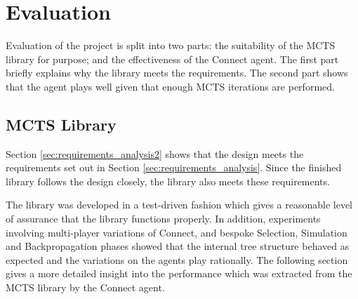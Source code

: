 \chapter{Evaluation}
Evaluation of the project is split into two parts: the suitability of the {MCTS} library for purpose; and the effectiveness of the {Connect} agent. The first part briefly explains why the library meets the requirements. The second part shows that the agent plays well given that enough {MCTS} iterations are performed.

\section{{MCTS} Library}
Section \ref{sec:requirements_analysis2} shows that the design meets the requirements set out in Section \ref{sec:requirements_analysis}. Since the finished library follows the design closely, the library also meets these requirements. 

The library was developed in a test-driven fashion which gives a reasonable level of assurance that the library functions properly. In addition, experiments involving multi-player variations of Connect, and bespoke Selection, Simulation and Backpropagation phases showed that the internal tree structure behaved as expected and the variations on the agents play rationally. The following section gives a more detailed insight into the performance which was extracted from the MCTS library by the Connect agent.

